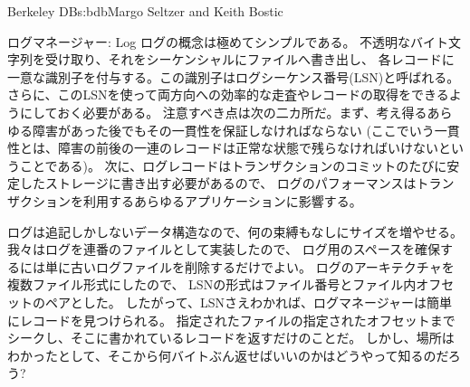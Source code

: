 \begin{aosachapter}{Berkeley DB}{s:bdb}{Margo Seltzer and Keith Bostic}
\begin{aosasect1}{ログマネージャー: Log}
ログの概念は極めてシンプルである。
不透明なバイト文字列を受け取り、それをシーケンシャルにファイルへ書き出し、
各レコードに一意な識別子を付与する。この識別子はログシーケンス番号(LSN)と呼ばれる。
さらに、このLSNを使って両方向への効率的な走査やレコードの取得をできるようにしておく必要がある。
注意すべき点は次の二カ所だ。まず、考え得るあらゆる障害があった後でもその一貫性を保証しなければならない
(ここでいう一貫性とは、障害の前後の一連のレコードは正常な状態で残らなければいけないということである)。
次に、ログレコードはトランザクションのコミットのたびに安定したストレージに書き出す必要があるので、
ログのパフォーマンスはトランザクションを利用するあらゆるアプリケーションに影響する。

ログは追記しかしないデータ構造なので、何の束縛もなしにサイズを増やせる。
我々はログを連番のファイルとして実装したので、
ログ用のスペースを確保するには単に古いログファイルを削除するだけでよい。
ログのアーキテクチャを複数ファイル形式にしたので、
LSNの形式はファイル番号とファイル内オフセットのペアとした。
したがって、LSNさえわかれば、ログマネージャーは簡単にレコードを見つけられる。
指定されたファイルの指定されたオフセットまでシークし、そこに書かれているレコードを返すだけのことだ。
しかし、場所はわかったとして、そこから何バイトぶん返せばいいのかはどうやって知るのだろう?


\end{aosasect1}
\end{aosachapter}
